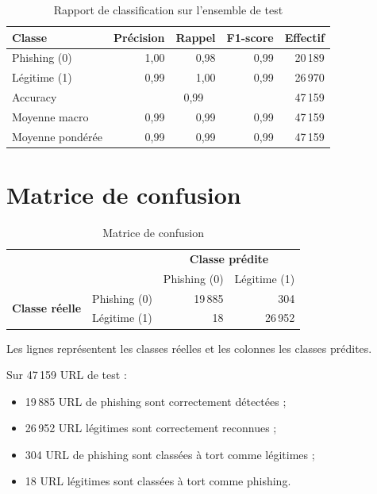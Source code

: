 \documentclass[11pt,a4paper]{report}
\begin{document}
\vspace{0.6cm}

\begin{table}[H]
\centering
\caption{Rapport de classification sur l'ensemble de test}
\begin{tabular}{lrrrr}
\toprule
\textbf{Classe} & \textbf{Précision} & \textbf{Rappel} &
\textbf{F1-score} & \textbf{Effectif}\\
\midrule
Phishing (0) & 1,00 & 0,98 & 0,99 & 20\,189\\
Légitime (1) & 0,99 & 1,00 & 0,99 & 26\,970\\
\midrule
Accuracy & \multicolumn{3}{c}{0,99} & 47\,159\\
Moyenne macro & 0,99 & 0,99 & 0,99 & 47\,159\\
Moyenne pondérée & 0,99 & 0,99 & 0,99 & 47\,159\\
\bottomrule
\end{tabular}
\end{table}

\section{Matrice de confusion}

\begin{table}[H]
\centering
\caption{Matrice de confusion}
\begin{tabular}{llrr}
\toprule
& & \multicolumn{2}{c}{\textbf{Classe prédite}}\\
& & Phishing (0) & Légitime (1)\\
\midrule
\multirow{2}{*}{\textbf{Classe réelle}} & Phishing (0) & 19\,885 & 304\\
& Légitime (1) & 18 & 26\,952\\
\bottomrule
\end{tabular}
\end{table}

\noindent Les lignes représentent les classes réelles et les colonnes les
classes prédites.

Sur 47\,159 URL de test :

\begin{itemize}
  \item 19\,885 URL de phishing sont correctement détectées ;
  \item 26\,952 URL légitimes sont correctement reconnues ;
  \item 304 URL de phishing sont classées à tort comme légitimes ;
  \item 18 URL légitimes sont classées à tort comme phishing.
\end{itemize}
\end{document}
